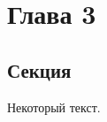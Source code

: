 \chapter{Глава 3}\label{ch:ch3}

\section{Секция}\label{sec:ch3/sec1}

Некоторый текст.

\FloatBarrier